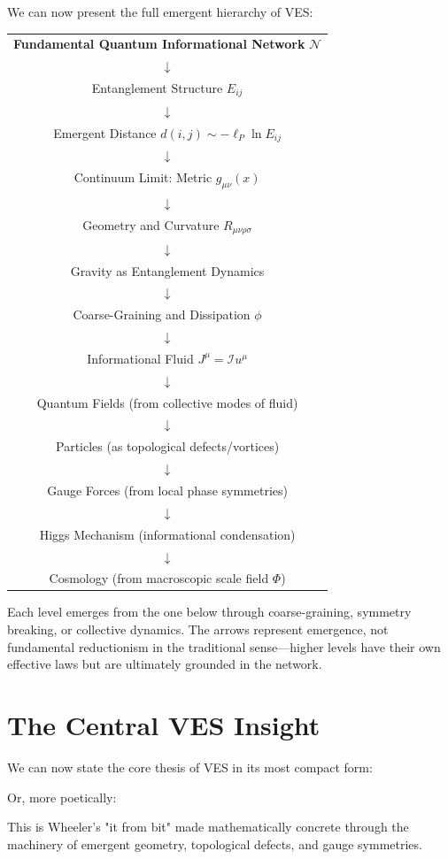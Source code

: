 \documentclass[12pt,a4paper]{book}
\newcommand{\I}{\mathcal{I}}
\begin{document}
We can now present the full emergent hierarchy of VES:
\begin{center}
\begin{tabular}{c}
\textbf{Fundamental Quantum Informational Network} $\mathcal{N}$ \\
$\downarrow$ \\
Entanglement Structure $E_{ij}$ \\
$\downarrow$ \\
Emergent Distance $d(i,j) \sim -\ell_P \ln E_{ij}$ \\
$\downarrow$ \\
Continuum Limit: Metric $g_{\mu\nu}(x)$ \\
$\downarrow$ \\
Geometry and Curvature $R_{\mu\nu\rho\sigma}$ \\
$\downarrow$ \\
Gravity as Entanglement Dynamics \\
$\downarrow$ \\
Coarse-Graining and Dissipation $\phi$ \\
$\downarrow$ \\
Informational Fluid $J^\mu = \I u^\mu$ \\
$\downarrow$ \\
Quantum Fields (from collective modes of fluid) \\
$\downarrow$ \\
Particles (as topological defects/vortices) \\
$\downarrow$ \\
Gauge Forces (from local phase symmetries) \\
$\downarrow$ \\
Higgs Mechanism (informational condensation) \\
$\downarrow$ \\
Cosmology (from macroscopic scale field $\Phi$)
\end{tabular}
\end{center}
Each level emerges from the one below through coarse-graining, symmetry breaking, or collective dynamics. The arrows represent emergence, not fundamental reductionism in the traditional sense—higher levels have their own effective laws but are ultimately grounded in the network.

\section{The Central VES Insight}

We can now state the core thesis of VES in its most compact form:
\begin{center}
\end{center}
Or, more poetically:
\begin{center}
\end{center}
This is Wheeler's "it from bit" made mathematically concrete through the machinery of emergent geometry, topological defects, and gauge symmetries.
\end{document}
